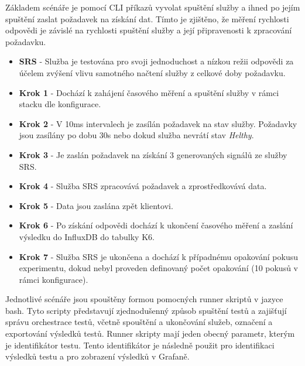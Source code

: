 Základem scénáře je pomocí CLI příkazů vyvolat spuštění služby a ihned po jejím spuštění zaslat požadavek na získání dat. Tímto je zjištěno, že měření rychlosti odpovědi je závislé na rychlosti spuštění služby a její připravenosti k zpracování požadavku. 



\begin{itemize}
    \item \textbf{SRS} - Služba je testována pro svoji jednoduchost a nízkou režii odpovědi za účelem zvýšení vlivu samotného načtení služby z celkové doby požadavku.
\end{itemize}


\begin{itemize}
    \item \textbf{Krok 1} - Dochází k zahájení časového měření a spuštění služby v rámci stacku dle konfigurace.
    \item \textbf{Krok 2} - V 10ms intervalech je zasílán požadavek na stav služby. Požadavky jsou zasílány po dobu 30s nebo dokud služba nevrátí stav \emph{Helthy}.
    \item \textbf{Krok 3} - Je zaslán požadavek na získání 3 generovaných signálů ze služby SRS.
    \item \textbf{Krok 4} - Služba SRS zpracovává požadavek a zprostředkovává data.
    \item \textbf{Krok 5} - Data jsou zaslána zpět klientovi.
    \item \textbf{Krok 6} - Po získání odpovědi dochází k ukončení časového měření a zaslání výsledku do InfluxDB do tabulky K6. 
    \item \textbf{Krok 7} - Služba SRS je ukončena a dochází k případnému opakování pokusu experimentu, dokud nebyl proveden definovaný počet opakování (10 pokusů v rámci konfigurace).
\end{itemize}


Jednotlivé scénáře jsou spouštěny formou pomocných runner skriptů v jazyce bash. Tyto scripty představují zjednodušenný způsob spuštění testů a zajišťují správu orchestrace testů, včetně spouštění a ukončování služeb, označení a exportování výsledků testů. Runner skripty mají jeden obecný parametr, kterým je identifikátor testu. Tento identifikátor je následně použit pro identifikaci výsledků testu a pro zobrazení výsledků v Grafaně.

